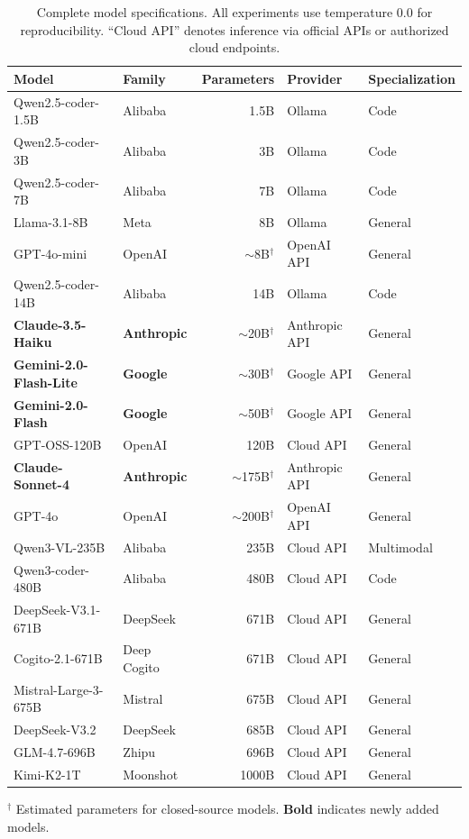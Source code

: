 \documentclass{article}
\theoremstyle{plain}
\theoremstyle{definition}
\begin{document}
\begin{table}[H]
\centering
\caption{Complete model specifications. All experiments use temperature 0.0 for reproducibility. ``Cloud API'' denotes inference via official APIs or authorized cloud endpoints.}
\label{tab:models}
\small
\begin{tabular}{llrll}
\toprule
\textbf{Model} & \textbf{Family} & \textbf{Parameters} & \textbf{Provider} & \textbf{Specialization} \\
\midrule
Qwen2.5-coder-1.5B & Alibaba & 1.5B & Ollama & Code \\
Qwen2.5-coder-3B & Alibaba & 3B & Ollama & Code \\
Qwen2.5-coder-7B & Alibaba & 7B & Ollama & Code \\
Llama-3.1-8B & Meta & 8B & Ollama & General \\
GPT-4o-mini & OpenAI & $\sim$8B$^\dagger$ & OpenAI API & General \\
Qwen2.5-coder-14B & Alibaba & 14B & Ollama & Code \\
\textbf{Claude-3.5-Haiku} & \textbf{Anthropic} & $\sim$20B$^\dagger$ & Anthropic API & General \\
\textbf{Gemini-2.0-Flash-Lite} & \textbf{Google} & $\sim$30B$^\dagger$ & Google API & General \\
\textbf{Gemini-2.0-Flash} & \textbf{Google} & $\sim$50B$^\dagger$ & Google API & General \\
GPT-OSS-120B & OpenAI & 120B & Cloud API & General \\
\textbf{Claude-Sonnet-4} & \textbf{Anthropic} & $\sim$175B$^\dagger$ & Anthropic API & General \\
GPT-4o & OpenAI & $\sim$200B$^\dagger$ & OpenAI API & General \\
Qwen3-VL-235B & Alibaba & 235B & Cloud API & Multimodal \\
Qwen3-coder-480B & Alibaba & 480B & Cloud API & Code \\
DeepSeek-V3.1-671B & DeepSeek & 671B & Cloud API & General \\
Cogito-2.1-671B & Deep Cogito & 671B & Cloud API & General \\
Mistral-Large-3-675B & Mistral & 675B & Cloud API & General \\
DeepSeek-V3.2 & DeepSeek & 685B & Cloud API & General \\
GLM-4.7-696B & Zhipu & 696B & Cloud API & General \\
Kimi-K2-1T & Moonshot & 1000B & Cloud API & General \\
\bottomrule
\end{tabular}

\vspace{1mm}
\parbox{0.92\linewidth}{\footnotesize $^\dagger$ Estimated parameters for closed-source models. \textbf{Bold} indicates newly added models.}
\end{table}
\end{document}
